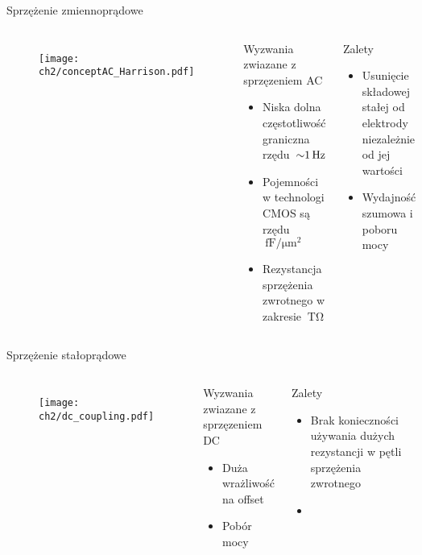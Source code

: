\begin{frame}{Sprzężenie zmiennoprądowe}
    \begin{columns}

    \begin{figure}[H]
        \centering
        \texttt{[image: ch2/conceptAC\_Harrison.pdf]} 
    \end{figure}
    \begin{alertblock}{Wyzwania zwiazane z sprzęzeniem AC}
        \begin{itemize}
            \item Niska dolna częstotliwość graniczna rzędu~$\SI{\sim 1}{\hertz}$ 
            \item Pojemności w technologi CMOS są rzędu $\SI{}{\femto\farad\per\micro\metre\squared}$
            \item Rezystancja sprzężenia zwrotnego w zakresie $\SI{}{\tera\ohm}$
        \end{itemize}
    \end{alertblock}
    \begin{exampleblock}{Zalety}
        \begin{itemize}
            \item Usunięcie składowej stałej od elektrody niezależnie od jej wartości
            \item Wydajność szumowa i poboru mocy
        \end{itemize}
    \end{exampleblock}
\end{columns}

\end{frame}



\begin{frame}{Sprzężenie stałoprądowe}
    \begin{columns}
        \begin{figure}[H]
            \centering
            \texttt{[image: ch2/dc\_coupling.pdf]}
        \end{figure}

    \begin{alertblock}{Wyzwania zwiazane z sprzęzeniem DC}
        \begin{itemize}
            \item Duża wrażliwość na offset
            \item Pobór mocy
        \end{itemize}
    \end{alertblock}
    \begin{exampleblock}{Zalety}
        \begin{itemize}
            \item Brak konieczności używania dużych rezystancji w pętli sprzężenia zwrotnego
            \item 
        \end{itemize}
    \end{exampleblock}
\end{columns}

\end{frame}


